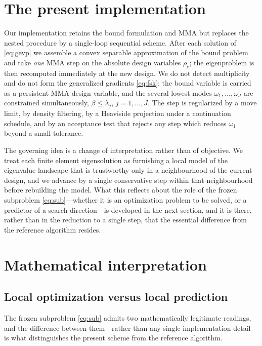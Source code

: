 \documentclass[11pt]{article}
\begin{document}
\section{The present implementation}

Our implementation retains the bound formulation and MMA but replaces the
nested procedure by a single-loop sequential scheme. After each solution
of \eqref{eq:gevp} we assemble a convex separable approximation of the
bound problem and take \emph{one} MMA step on the absolute design
variables $\rho_e$; the eigenproblem is then recomputed immediately at the
new design. We do not detect multiplicity and do not form the generalized
gradients \eqref{eq:fsk}: the bound variable is carried as a persistent
MMA design variable, and the several lowest modes $\omega_1,\dots,\omega_J$
are constrained simultaneously, $\beta\le\lambda_j$, $j=1,\dots,J$. The
step is regularized by a move limit, by density filtering, by a Heaviside
projection under a continuation schedule, and by an acceptance test that
rejects any step which reduces $\omega_1$ beyond a small tolerance.

The governing idea is a change of interpretation rather than of
objective. We treat each finite element eigensolution as furnishing a
local model of the eigenvalue landscape that is trustworthy only in a
neighbourhood of the current design, and we advance by a single
conservative step within that neighbourhood before rebuilding the model.
What this reflects about the role of the frozen subproblem
\eqref{eq:sub}---whether it is an optimization problem to be solved, or a
predictor of a search direction---is developed in the next section, and it
is there, rather than in the reduction to a single step, that the essential
difference from the reference algorithm resides.

\section{Mathematical interpretation}

\subsection{Local optimization versus local prediction}

The frozen subproblem \eqref{eq:sub} admits two mathematically legitimate
readings, and the difference between them---rather than any single
implementation detail---is what distinguishes the present scheme from the
reference algorithm.
\end{document}
